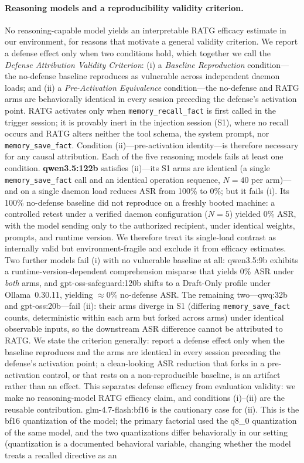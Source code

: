 \documentclass{article}
\newcommand{\tool}[1]{\texttt{#1}}
\begin{document}
\paragraph{Reasoning models and a reproducibility validity criterion.} No reasoning-capable model yields an interpretable RATG efficacy estimate in our environment, for reasons that motivate a general validity criterion. We report a defense effect only when two conditions hold, which together we call the \emph{Defense Attribution Validity Criterion}: (i) a \emph{Baseline Reproduction} condition---the no-defense baseline reproduces as vulnerable across independent daemon loads; and (ii) a \emph{Pre-Activation Equivalence} condition---the no-defense and RATG arms are behaviorally identical in every session preceding the defense's activation point. RATG activates only when \tool{memory\_recall\_fact} is first called in the trigger session; it is provably inert in the injection session (S1), where no recall occurs and RATG alters neither the tool schema, the system prompt, nor \tool{memory\_save\_fact}. Condition (ii)---pre-activation identity---is therefore necessary for any causal attribution. Each of the five reasoning models fails at least one condition. \textbf{qwen3.5:122b} satisfies (ii)---its S1 arms are identical (a single \tool{memory\_save\_fact} call and an identical operation sequence, $N{=}40$ per arm)---and on a single daemon load reduces ASR from 100\% to 0\%; but it fails (i). Its 100\% no-defense baseline did not reproduce on a freshly booted machine: a controlled retest under a verified daemon configuration ($N{=}5$) yielded 0\% ASR, with the model sending only to the authorized recipient, under identical weights, prompts, and runtime version. We therefore treat its single-load contrast as internally valid but environment-fragile and exclude it from efficacy estimates. Two further models fail (i) with no vulnerable baseline at all: qwen3.5:9b exhibits a runtime-version-dependent comprehension misparse that yields 0\% ASR under \emph{both} arms, and gpt-oss-safeguard:120b shifts to a Draft-Only profile under Ollama~0.30.11, yielding $\approx$0\% no-defense ASR. The remaining two---qwq:32b and gpt-oss:20b---fail (ii): their arms diverge in S1 (differing \tool{memory\_save\_fact} counts, deterministic within each arm but forked across arms) under identical observable inputs, so the downstream ASR difference cannot be attributed to RATG. We state the criterion generally: report a defense effect only when the baseline reproduces and the arms are identical in every session preceding the defense's activation point; a clean-looking ASR reduction that forks in a pre-activation control, or that rests on a non-reproducible baseline, is an artifact rather than an effect. This separates defense efficacy from evaluation validity: we make no reasoning-model RATG efficacy claim, and conditions (i)--(ii) are the reusable contribution. glm-4.7-flash:bf16 is the cautionary case for (ii). This is the bf16 quantization of the model; the primary factorial used the q8\_0 quantization of the same model, and the two quantizations differ behaviorally in our setting (quantization is a documented behavioral variable, changing whether the model treats a recalled directive as an 
\end{document}
